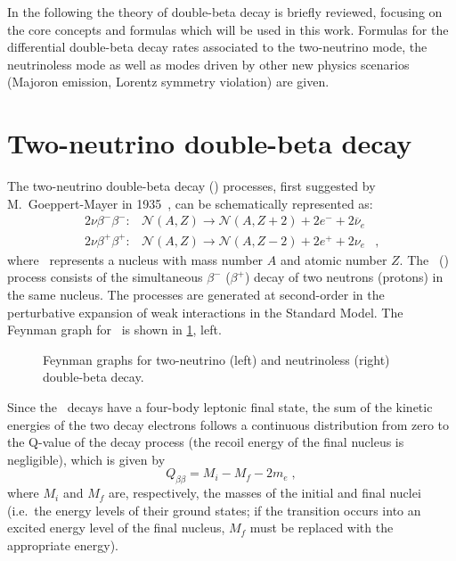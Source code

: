 In the following the theory of double-beta decay is briefly reviewed, focusing
on the core concepts and formulas which will be used in this work. Formulas for
the differential double-beta decay rates associated to the two-neutrino mode,
the neutrinoless mode as well as modes driven by other new physics scenarios
(Majoron emission, Lorentz symmetry violation) are given. 

\section{Two-neutrino double-beta decay}\label{sec:nbb:2nbb}

The two-neutrino double-beta decay (\nnbb) processes, first suggested by
M.~Goeppert-Mayer in 1935~\cite{GoeppertMayer1935}, can be schematically
represented as:
\[
  \begin{array}{llr}
    2\nu\beta^-\beta^-: &
      \mathcal{N}(A,Z) \longrightarrow \mathcal{N}(A,Z+2)+2e^-+2{\overline \nu}_e & \\
    2\nu\beta^+\beta^+: &
      \mathcal{N}(A,Z) \longrightarrow \mathcal{N}(A,Z-2)+2e^++2\nu_e &,
  \end{array}
\]
where \NAZ\ represents a nucleus with mass number $A$ and atomic number $Z$. The
\nnbbm\ (\nnbbp) process consists of the simultaneous $\beta^-$ ($\beta^+$)
decay of two neutrons (protons) in the same nucleus. The processes are
generated at second-order in the perturbative expansion of weak interactions in
the Standard Model. The Feynman graph for \nnbbm\ is shown in
\cref{fig:nbb:feydiag}, left.

\begin{figure}
  \centering%
  \caption{%
    Feynman graphs for two-neutrino (left) and neutrinoless (right) double-beta
    decay.
  }\label{fig:nbb:feydiag}
\end{figure}

Since the \nnbb\ decays have a four-body leptonic final state, the sum of the
kinetic energies of the two decay electrons follows a continuous distribution
from zero to the Q-value of the decay process (the recoil energy of the final
nucleus is negligible), which is given by
\[
  Q_{\beta\beta} = M_i - M_f - 2m_e \;,
\]
where $M_i$ and $M_f$ are, respectively, the masses of the initial and final
nuclei (i.e.~the energy levels of their ground states; if the transition occurs
into an excited energy level of the final nucleus, $M_f$ must be replaced with
the appropriate energy).

